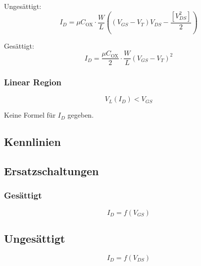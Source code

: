 \medskip

\begin{minipage}{0.48\columnwidth}
    Ungesättigt:
    \[I_D = \mu C_{\text{OX}} \cdot \frac{W}{L} ((V_{GS} - V_T) V_{DS} - \frac{[V_{DS}^2]}{2})\]
\end{minipage}
\hfill
\begin{minipage}{0.48\columnwidth}
    Gesättigt:
    \[I_D = \frac{\mu C_{\text{OX}}}{2} \cdot \frac{W}{L} (V_{GS} - V_T)^2\]
\end{minipage}

\subsubsection{Linear Region}
\begin{center}
    \[\boxed{V_L(I_D) < V_{GS}}\]
\end{center}

Keine Formel für $I_D$ gegeben.

\subsection{Kennlinien}

\subsection{Ersatzschaltungen}

\subsubsection{Gesättigt}
\begin{center}
    \[\boxed{I_D = f(V_{GS})}\]
\end{center}

\subsection{Ungesättigt}
\begin{center}
    \[\boxed{I_D = f(V_{DS})}\]
\end{center}